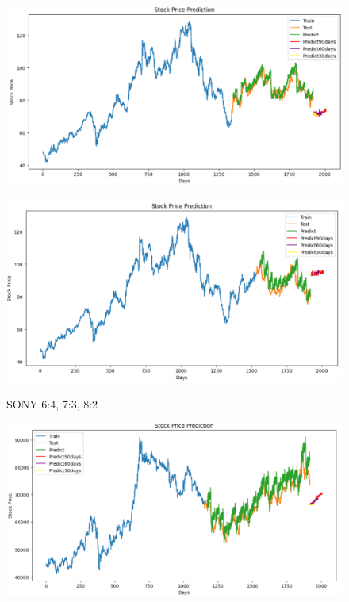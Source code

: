 \documentclass{article}
\begin{document}
\begin{multicols}{2}
\begin{figure}[H]
\begin{minipage}{0.15\textwidth}
    \label{fig:1}
    \end{minipage}%
    \begin{minipage}{0.15\textwidth}
    \centering
    \includegraphics[width=1\textwidth]{Image/NBeat/N_BEAT_SONY_7_3.png}
  
    \label{fig:2}
    \end{minipage}%
    \begin{minipage}{0.15\textwidth}
    \centering
    \includegraphics[width=1\textwidth]{Image/NBeat/N_BEAT_SONY_8_2.png}

    \label{fig:3}
    \end{minipage}
    \caption{SONY  6:4, 7:3, 8:2 }
\end{figure}



\begin{figure}[H]
    \centering
    \begin{minipage}{0.15\textwidth}
    \centering
    \includegraphics[width=1\textwidth]{Image/NBeat/N_BEAT_SAMSUNG_6_4.png}
   

\end{minipage}
\end{figure}
\end{multicols}
\end{document}
